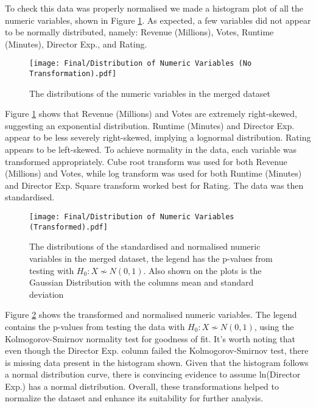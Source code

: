         To check this data was properly normalised we made a histogram plot of all the numeric variables, shown in Figure \ref*{fig-distribution-of-numeric-variable}.
        As expected, a few variables did not appear to be normally distributed, namely: Revenue (Millions), Votes, Runtime (Minutes), 
            Director Exp., and Rating.
        \begin{figure}[H]
            \centering
            \texttt{[image: Final/Distribution of Numeric Variables (No Transformation).pdf]}
            \caption[short]{The distributions of the numeric variables in the merged dataset}\label{fig-distribution-of-numeric-variable}
        \end{figure}
        Figure \ref*{fig-distribution-of-numeric-variable} shows that Revenue (Millions) and Votes are extremely right-skewed, suggesting an exponential distribution.
        Runtime (Minutes) and Director Exp. appear to be less severely right-skewed, implying a lognormal distribution.
        Rating appears to be left-skewed.
        To achieve normality in the data, each variable was transformed appropriately.
        Cube root transform was used for both Revenue (Millions) and Votes, while log transform was used for both Runtime (Minutes) and Director Exp.
        Square transform worked best for Rating. 
        The data was then standardised.
        \begin{figure}[H]
            \centering
            \texttt{[image: Final/Distribution of Numeric Variables (Transformed).pdf]}
            \caption[short]{The distributions of the standardised and normalised numeric variables in the merged dataset,
                            the legend has the p-values from testing with $H_{0}: X \not\sim N(0,1)$. Also shown on the plots is
                            the Gaussian Distribution with the columns mean and standard deviation}\label{fig-transformed-distribution-of-numeric-variable}
        \end{figure}
        Figure \ref*{fig-transformed-distribution-of-numeric-variable} shows the transformed and normalised numeric variables.
        The legend contains the p-values from testing the data with $H_{0}: X \not\sim N(0,1)$, using the Kolmogorov-Smirnov normality
            test\cite*{KStest} for goodness of fit.
        It's worth noting that even though the Director Exp. column failed the Kolmogorov-Smirnov test, there is missing data present in the histogram shown.
        Given that the histogram follows a normal distribution curve, there is convincing evidence to assume ln(Director Exp.) has a normal distribution.
        Overall, these transformations helped to normalize the dataset and enhance its suitability for further analysis.
